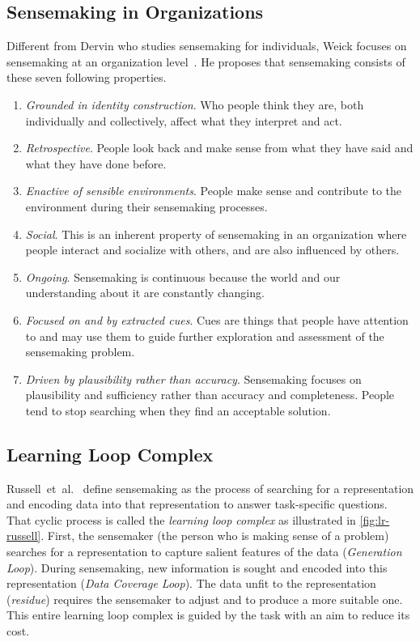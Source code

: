 \subsection{Sensemaking in Organizations}
Different from Dervin who studies sensemaking for individuals, Weick focuses on sensemaking at an organization level~\cite{Weick1995}. He proposes that sensemaking consists of these seven following properties.

\begin{enumerate}
	\item \emph{Grounded in identity construction}. Who people think they are, both individually and collectively, affect what they interpret and act.
	\item \emph{Retrospective}. People look back and make sense from what they have said and what they have done before.
	\item \emph{Enactive of sensible environments}. People make sense and contribute to the environment during their sensemaking processes.
	\item \emph{Social}. This is an inherent property of sensemaking in an organization where people interact and socialize with others, and are also influenced by others.
	\item \emph{Ongoing}. Sensemaking is continuous because the world and our understanding about it are constantly changing.
	\item \emph{Focused on and by extracted cues}. Cues are things that people have attention to and may use them to guide further exploration and assessment of the sensemaking problem.
	\item \emph{Driven by plausibility rather than accuracy}. Sensemaking focuses on plausibility and sufficiency rather than accuracy and completeness. People tend to stop searching when they find an acceptable solution.
\end{enumerate}

\subsection{Learning Loop Complex}
Russell~et~al.~\cite{Russell1993} define sensemaking as the process of searching for a representation and encoding data into that representation to answer task-specific questions. That cyclic process is called the \emph{learning loop complex} as illustrated in \autoref{fig:lr-russell}. First, the sensemaker (the person who is making sense of a problem) searches for a representation to capture salient features of the data (\emph{Generation Loop}). During sensemaking, new information is sought and encoded into this representation (\emph{Data Coverage Loop}). The data unfit to the representation (\emph{residue}) requires the sensemaker to adjust and to produce a more suitable one. This entire learning loop complex is guided by the task with an aim to reduce its cost.

